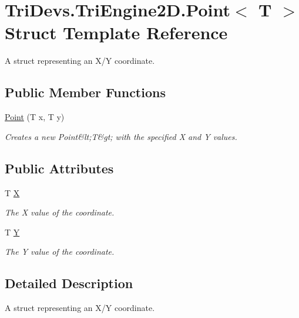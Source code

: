 \hypertarget{struct_tri_devs_1_1_tri_engine2_d_1_1_point_3_01_t_01_4}{\section{Tri\-Devs.\-Tri\-Engine2\-D.\-Point$<$ T $>$ Struct Template Reference}
\label{struct_tri_devs_1_1_tri_engine2_d_1_1_point_3_01_t_01_4}
}


A struct representing an X/\-Y coordinate.  


\subsection*{Public Member Functions}
\begin{DoxyCompactItemize}
\item 
\hyperlink{struct_tri_devs_1_1_tri_engine2_d_1_1_point_3_01_t_01_4_aeae1b927b6709bd313df1ef3cd1f2f4c}{Point} (T x, T y)
\begin{DoxyCompactList}\small\item\em Creates a new Point\&lt;\-T\&gt; with the specified X and Y values. \end{DoxyCompactList}\end{DoxyCompactItemize}
\subsection*{Public Attributes}
\begin{DoxyCompactItemize}
\item 
T \hyperlink{struct_tri_devs_1_1_tri_engine2_d_1_1_point_3_01_t_01_4_a2738701b3c9f15a960ea2348a8c8d07a}{X}
\begin{DoxyCompactList}\small\item\em The X value of the coordinate. \end{DoxyCompactList}\item 
T \hyperlink{struct_tri_devs_1_1_tri_engine2_d_1_1_point_3_01_t_01_4_a46cca63b4166f1794cd812fe085d237d}{Y}
\begin{DoxyCompactList}\small\item\em The Y value of the coordinate. \end{DoxyCompactList}\end{DoxyCompactItemize}


\subsection{Detailed Description}
A struct representing an X/\-Y coordinate. 



